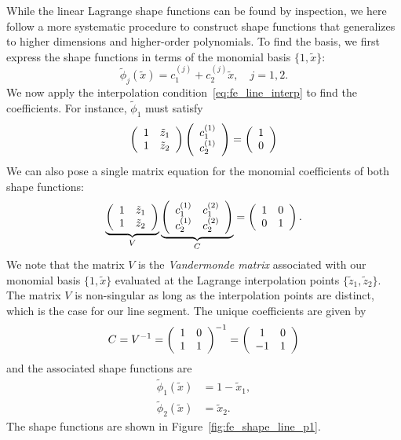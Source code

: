While the linear Lagrange shape functions can be found by inspection, we here follow a more systematic procedure to construct shape functions that generalizes to higher dimensions and higher-order polynomials. To find the basis, we first express the shape functions in terms of the monomial basis $\{1,\tilde x\}$:
\begin{equation}
  \tilde \phi_j(\tilde x) = c^{(j)}_1 + c^{(j)}_2 \tilde x,  \quad j = 1, 2.
  \label{eq:fe_lin_line_rep}
\end{equation}
We now apply the interpolation condition~\eqref{eq:fe_line_interp} to find the coefficients.  For instance, $\tilde \phi_1$ must satisfy
\begin{equation*}
  \bmat{cc}
  1 & \tilde z_1 \\
  1 & \tilde z_2 \\
  \emat
  \bmat{c}
  c^{(1)}_1 \\ c^{(1)}_2
  \emat
  =
  \bmat{c}
  1 \\ 0 
  \emat
\end{equation*}
We can also pose a single matrix equation for the monomial coefficients of both shape functions: 
\begin{equation*}
  \underbrace{ \bmat{cc}
  1 & \tilde z_1 \\
  1 & \tilde z_2 \\
  \emat }_{V}
  \underbrace{ 
  \bmat{cc}
  c_1^{(1)} & c_1^{(2)} \\
  c_2^{(1)} & c_2^{(2)} \\
  \emat }_{C}
  =
  \bmat{cc}
  1 & 0 \\
  0 & 1 \\
  \emat.
\end{equation*}
We note that the matrix $V$ is the \emph{Vandermonde matrix} associated with our monomial basis $\{ 1,\tilde x\}$ evaluated at the Lagrange interpolation points $\{\tilde z_1, \tilde z_2\}$.  The matrix $V$ is non-singular as long as the interpolation points are distinct, which is the case for our line segment. The unique coefficients are given by
\begin{equation*}
  C
  = V^{-1}
  = \bmat{cc} 1 & 0 \\ 1 & 1 \emat^{-1}
  = \bmat{cc} 1 & 0 \\ -1 & 1 \emat
\end{equation*}
and the associated shape functions are
\begin{align*}
  \tilde \phi_1(\tilde x) &= 1 - \tilde x_1 , \\
  \tilde \phi_2(\tilde x) &= \tilde x_2.
\end{align*}
The shape functions are shown in Figure~\ref{fig:fe_shape_line_p1}.

